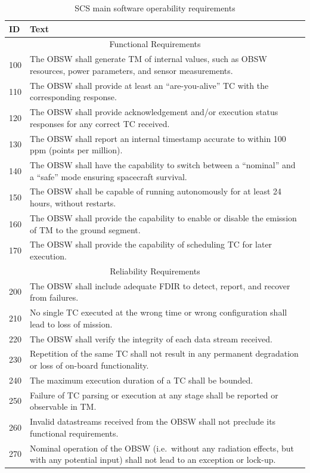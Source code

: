 \documentclass[a4paper,nobib,justified,final]{tufte-book}
\begin{document}
\begin{table}[h]
	\begin{tabularx}{\linewidth}{@{}lX@{}}
		\toprule
		ID & Text \\ \midrule
		\multicolumn{2}{c}{Functional Requirements} \\ \midrule
		100 & The OBSW shall generate TM of internal values, such as OBSW resources, power parameters, and sensor measurements. \\
		110 & The OBSW shall provide at least an ``are-you-alive'' \acs{TC} with the corresponding response. \\
		120 & The OBSW shall provide acknowledgement and/or execution status responses for any correct \acs{TC} received. \\
		130 & The OBSW shall report an internal timestamp accurate to within 100 ppm (points per million). \\
		140 & The OBSW shall have the capability to switch between a ``nominal'' and a ``safe'' mode ensuring spacecraft survival.  \\
		150 & The OBSW shall be capable of running autonomously for at least 24 hours, without restarts. \\
		160 & The OBSW shall provide the capability to enable or disable the emission of TM to the ground segment. \\
		170 & The OBSW shall provide the capability of scheduling TC for later execution. \\
		\midrule
		\multicolumn{2}{c}{Reliability Requirements} \\ \midrule
		200 & The OBSW shall include adequate FDIR to detect, report, and recover from failures. \\
		210 & No single TC executed at the wrong time or wrong configuration shall lead to loss of mission. \\
		220 & The OBSW shall verify the integrity of each data stream received. \\
		230 & Repetition of the same TC shall not result in any permanent degradation or loss of on-board functionality. \\
		240 & The maximum execution duration of a TC shall be bounded. \\
		250 & Failure of TC parsing or execution at any stage shall be reported or observable in TM. \\
		260 & Invalid datastreams received from the OBSW shall not preclude its functional requirements. \\
		270 & Nominal operation of the OBSW (i.e.~without any radiation effects, but with any potential input) shall not lead to an exception or lock-up. \\ \bottomrule
	\end{tabularx}
	\caption[SCS main software operability requirements]{\acs{SCS} main software operability requirements}
	\label{tab:m_software_requirements}
\end{table}
\end{document}
